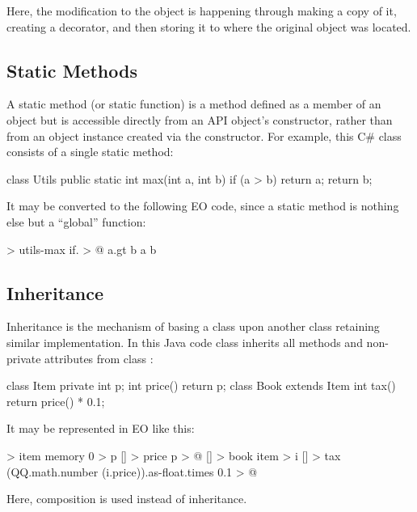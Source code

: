 \documentclass[sigplan,11pt,nonacm,natbib=false]{acmart}
\begin{document}
Here, the modification to the object  is happening through making a copy of it, creating a decorator, and then storing it to where the original object was located.

\subsection{Static Methods}
\label{sec:static}

A static method (or static function) is a method defined as a member of an object but is accessible directly from an API object's constructor, rather than from an object instance created via the constructor. For example, this C\# class consists of a single static method:

\begin{ffcode}
class Utils {  
  public static int max(int a, int b) {
    if (a > b) return a;
    return b;
  }
}  
\end{ffcode}

It may be converted to the following EO code, since a static method is nothing else but a ``global'' function:

\begin{ffcode}
[a b] > utils-max
  if. > @
    a.gt b
    a
    b
\end{ffcode}

\subsection{Inheritance}
\label{sec:inheritance}

Inheritance is the mechanism of basing a class upon another class retaining similar implementation. In this Java code class  inherits all methods and non-private attributes from class :

\begin{ffcode}
class Item {
  private int p;
  int price() { return p; }
}
class Book extends Item {
  int tax() { return price() * 0.1; }
}
\end{ffcode}

It may be represented in EO like this:

\begin{ffcode}
[] > item
  memory 0 > p
  [] > price
    p > @
[] > book
  item > i
  [] > tax
    (QQ.math.number (i.price)).as-float.times 0.1 > @
\end{ffcode}

Here, composition is used instead of inheritance.
\end{document}
